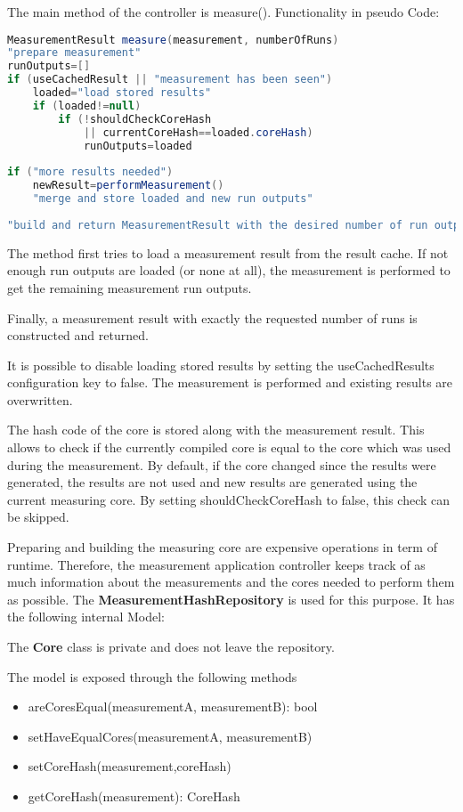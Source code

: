 \documentclass[a4paper,12pt]{article}
\newlength{\imgwidth}
\newcommand{\umlDiagram}[1]{%
	\settowidth{\imgwidth}{\texttt{[image: out/diagrams/\#1.pdf]}}%
	\setlength{\imgwidth}{\minof{0.5\imgwidth}{\textwidth}}%
	\par\vskip0.5cm\noindent\makebox[\textwidth][c]{%
	\texttt{[image: out/diagrams/\#1.pdf]}%
}\vskip0.5cm}
\newcommand{\class}[1]{\textbf{#1}}
\begin{document}
The main method of the controller is measure(). Functionality in pseudo Code:

\begin{minipage}{\textwidth-18pt}
\begin{lstlisting}[language=Java,style=pseudoCode]
MeasurementResult measure(measurement, numberOfRuns)
"prepare measurement"
runOutputs=[]
if (useCachedResult || "measurement has been seen")
	loaded="load stored results"
	if (loaded!=null)
		if (!shouldCheckCoreHash
			|| currentCoreHash==loaded.coreHash)
			runOutputs=loaded
			
if ("more results needed")
	newResult=performMeasurement()
	"merge and store loaded and new run outputs"
	
"build and return MeasurementResult with the desired number of run outputs"
\end{lstlisting}
\end{minipage}

The method first tries to load a measurement result from the result cache. If
not enough run outputs are loaded (or none at all), the measurement is performed
to get the remaining measurement run outputs.

Finally, a measurement result with exactly the requested number of runs is
constructed and returned.

It is possible to disable loading stored results by setting the useCachedResults
configuration key to false. The measurement is performed and existing results
are overwritten.

The hash code of the core is stored along with the measurement result. This
allows to check if the currently compiled core is equal to the core which was
used during the measurement. By default, if the core changed since the results
were generated, the results are not used and new results are generated using the
current measuring core. By setting shouldCheckCoreHash to false, this check can
be skipped.

Preparing and building the measuring core are expensive operations in term of
runtime. Therefore, the measurement application controller keeps track of as
much information about the measurements and the cores needed to perform them as
possible. The \class{MeasurementHashRepository} is used for this purpose. It
has the following internal Model: 
\umlDiagram{measurementDriver/MeasurementHashRepositoryModel}

The \class{Core} class is private and does not leave the repository.

The model is exposed through the following methods
\begin{itemize}
  \item areCoresEqual(measurementA, measurementB): bool
  \item setHaveEqualCores(measurementA, measurementB)
  \item setCoreHash(measurement,coreHash)
  \item getCoreHash(measurement): CoreHash
\end{itemize}
\end{document}
